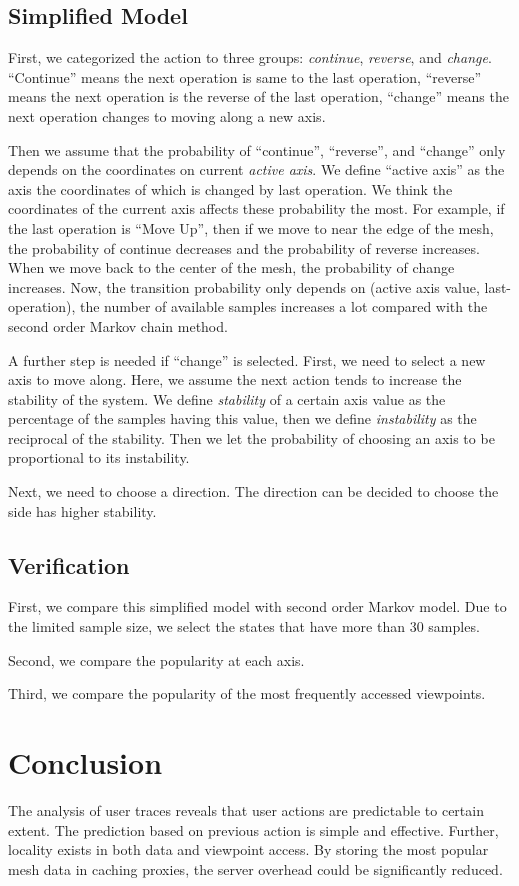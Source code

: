\subsection{Simplified Model}
First, we categorized the action to three groups: \textit{continue}, \textit{reverse}, and \textit{change}. 
``Continue'' means the next operation is same to the last operation, ``reverse'' means the next operation
is the reverse of the last operation, ``change'' means the next operation changes to moving along a new axis.

Then we assume that the probability of ``continue'', ``reverse'', and ``change'' only depends on the coordinates
on current \textit{active axis}. We define ``active axis'' as the axis the coordinates of which is changed by last operation.
We think the coordinates of the current axis affects these probability the most. For example, if the last operation
is ``Move Up'', then if we move to near the edge of the mesh, the probability of continue decreases and the probability
of reverse increases. When we move back to the center of the mesh, the probability of change increases. Now, the transition
probability only depends on (active axis value, last-operation), the number of available samples increases a lot compared
with the second order Markov chain method. 

A further step is needed if ``change'' is selected. First, we need to select a new axis to move along. Here, we 
assume the next action tends to increase the stability of the system. We define \textit{stability} of a certain 
axis value as the percentage of the samples having this value, then we define \textit{instability} as the reciprocal 
of the stability. Then we let the probability of choosing an axis to be proportional to its instability.  

Next, we need to choose a direction. The direction can be decided to choose the side has higher stability. 
\subsection{Verification}
First, we compare this simplified model with second order Markov model. Due to the limited sample size, we 
select the states that have more than 30 samples. 

Second, we compare the popularity at each axis. 

Third, we compare the popularity of the most frequently accessed viewpoints.
\section{Conclusion}
The analysis of user traces reveals that 
user actions are predictable to certain extent. The
prediction based on previous action is simple and effective. 
Further, locality exists in both data and viewpoint access. By
storing the most popular mesh data in caching proxies, 
the server overhead could be significantly reduced. 

